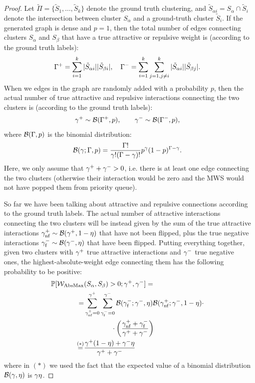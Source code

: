 \begin{proof}
Let $\tilde{\Pi}=\{\tilde{S}_1,\ldots,\tilde{S}_k\}$ denote the ground truth clustering, and $\tilde{S}_{\alpha i}=S_\alpha\cap \tilde{S}_i$ denote the intersection between cluster $S_{\alpha}$ and a ground-truth cluster $\tilde{S}_i$.
If the generated graph is dense and $p=1$, then the total number of edges connecting clusters $S_{\alpha}$ and $S_{\beta}$ that have a true attractive or repulsive weight is (according to the ground truth labels):
\begin{equation}
\Gamma^+=\sum_{i=1}^k |\tilde{S}_{\alpha i}||\tilde{S}_{\beta i}|, \quad \Gamma^-=\sum_{i=1}^k \sum_{j=1,j\neq i}^k |\tilde{S}_{\alpha i}||\tilde{S}_{\beta j}|.
\end{equation}
When we edges in the graph are randomly added with a probability $p$, then the actual number of true attractive and repulsive interactions connecting the two clusters is (according to the ground truth labels):
\begin{equation}
\gamma^+ \sim \mathcal{B}(\Gamma^+,p), \qquad \gamma^- \sim \mathcal{B}(\Gamma^-,p), 
\end{equation}
where $\mathcal{B}(\Gamma,p)$ is the binomial distribution:
\begin{equation}
\mathcal{B}(\gamma;\Gamma,p) = \frac{\Gamma !}{\gamma! (\Gamma-\gamma)!} p^\gamma (1-p)^{\Gamma-\gamma}.
\end{equation}
Here, we only assume that $\gamma^+ + \gamma^- >0$, i.e. there is at least one edge connecting the two clusters (otherwise their interaction would be zero and the MWS would not have popped them from priority queue). 

So far we have been talking about attractive and repulsive connections according to the ground truth labels. The actual number of attractive interactions connecting the two clusters will be instead given by the sum of the true attractive interactions $\gamma^+_{\mathrm{nf}}\sim \mathcal{B}(\gamma^+,1-\eta)$ that have not been flipped, plus the true negative interactions $\gamma^-_{\mathrm{f}}\sim \mathcal{B}(\gamma^-,\eta)$ that have been flipped.
Putting everything together, given two clusters with $\gamma^+$ true attractive interactions and $\gamma^-$ true negative ones, the highest-absolute-weight edge connecting them has the following probability to be positive:
\begin{align}
 \mathbb{P}[\mathcal{W}_{\mathrm{AbsMax}}&(S_\alpha,S_\beta)>0;\gamma^+,\gamma^-] = \nonumber \\
=&\sum_{\gamma^+_{\mathrm{nf}}=0}^{\gamma^+}\sum_{\gamma^-_{\mathrm{f}}=0}^{\gamma^-} 
\mathcal{B}(\gamma^-_{\mathrm{f}};\gamma^-,\eta) \mathcal{B}(\gamma^+_{\mathrm{nf}};\gamma^-,1-\eta)\cdot  \nonumber\\
& \qquad \qquad  \cdot \left(\frac{\gamma^+_{\mathrm{nf}}+\gamma^-_{\mathrm{f}}}{\gamma^+ + \gamma^-} \right) \nonumber\\
\stackrel{(*)}{=}&\frac{\gamma^+(1-\eta)+\gamma^-\eta}{\gamma^+ + \gamma^-}
\end{align}  
where in $(*)$ we used the fact that the expected value of a binomial distribution $\mathcal{B}(\gamma,\eta)$ is $\gamma \eta$.


\end{proof}
